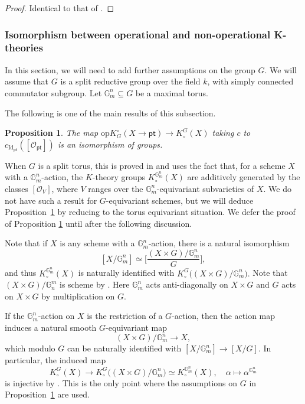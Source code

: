 \documentclass[12pt]{amsart}
\newcommand\G{\mathbb{G}}
\newcommand\Gm{\mathbb{G}_m}
\newcommand{\sO}{\mathscr{O}}
\newcommand{\Kgroup}{K_{\circ}}
\newcommand{\opK}{\mathrm{op}K^{\circ}}
\newtheorem{Prop}[theorem]{Proposition}
\theoremstyle{definition}
\begin{document}
\begin{proof}
    Identical to that of \cite[Proposition 4.3]{AndersonPayne-OperationalKtheory}.
\end{proof}

\subsubsection{Isomorphism between operational and non-operational K-theories}

In this section, we will need to add further assumptions on the group $G$. We will assume that $G$ is a split reductive group over the field $k$, with simply connected commutator subgroup. Let $\Gm^n \subseteq G$ be a maximal torus.

The following is one of the main results of this subsection.

\begin{Prop}\label{prop: iso over GLn}
    The map $\opK_{G}(X \to \mathsf{pt}) \to \Kgroup^{G}(X)$ taking $c$ to $c_{\mathrm{Id}_{\mathsf{pt}}}([\sO_{\mathsf{pt}}])$ is an isomorphism of groups.
\end{Prop}

When $G$ is a split torus, this is proved in \cite[Lemma 2.2]{AndersonPayne-OperationalKtheory} and uses the fact that, for a scheme $X$ with a $\Gm^n$-action, the $K$-theory groups $\Kgroup^{\Gm^n}(X)$ are additively generated by the classes $[\sO_V]$, where $V$ ranges over the $\Gm^n$-equivariant subvarieties of $X$.
We do not have such a result for $G$-equivariant schemes, but we will deduce Proposition~\ref{prop: iso over GLn} by reducing to the torus equivariant situation. We defer the proof of Proposition \ref{prop: iso over GLn} until after the following discussion.

Note that if $X$ is any scheme with a $\Gm^n$-action, there is a natural isomorphism
\[
[X/\Gm^n] \simeq \bigg[ \frac{(X \times G)/\Gm^n}{G} \bigg],
\]
and thus $\Kgroup^{\Gm^n}(X)$ is naturally identified with 
$
\Kgroup^{G}\big((X \times G)/\Gm^n\big).
$
Note that $(X \times G)/\G^m_n$ is scheme by \cite[Proposition 23]{EG}.
Here $\Gm^n$ acts anti-diagonally on $X \times G$ and $G$ acts on $X \times G$ by multiplication on $G$.

If the $\Gm^n$-action on $X$ is the restriction of a $G$-action, then the action map induces a natural smooth $G$-equivariant map
\[
(X \times G)/\Gm^n \longrightarrow X,
\]
which modulo $G$ can be naturally identified with $[X/\Gm^n] \to [X/G]$. In particular, the induced map
\begin{equation}\label{eqn: inclusion in TK}
\Kgroup^{G}(X) \longrightarrow 
\Kgroup^{G}\big((X \times G)/\Gm^n\big) \simeq \Kgroup^{\Gm^n}(X), \quad
\alpha \longmapsto \alpha^{\Gm^n}
\end{equation}
is injective by \cite[Proposition 31]{Merkurjev-equivariantKtheory}. This is the only point where the assumptions on $G$ in Proposition~\ref{prop: iso over GLn} are used.
\end{document}
